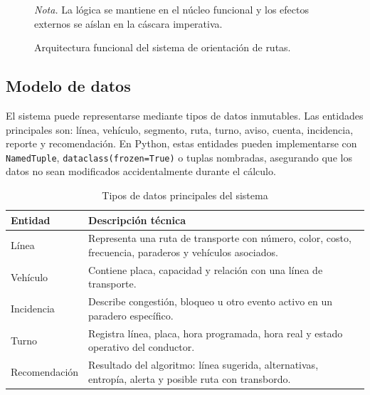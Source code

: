 \documentclass[stu,12pt,floatsintext]{apa7}
\begin{document}
\begin{figure}[H]
\centering
{}
\caption{Arquitectura funcional del sistema de orientación de rutas.}
\par\small\textit{Nota.} La lógica se mantiene en el núcleo funcional y los efectos externos se aíslan en la cáscara imperativa.
\label{fig:arquitectura}
\end{figure}

\subsection{Modelo de datos}
El sistema puede representarse mediante tipos de datos inmutables. Las entidades principales son: línea, vehículo, segmento, ruta, turno, aviso, cuenta, incidencia, reporte y recomendación. En Python, estas entidades pueden implementarse con \texttt{NamedTuple}, \texttt{dataclass(frozen=True)} o tuplas nombradas, asegurando que los datos no sean modificados accidentalmente durante el cálculo.

\begin{table}[H]
\centering
\caption{Tipos de datos principales del sistema}
\begin{tabular}{p{3.2cm}p{9cm}}
\toprule
\textbf{Entidad} & \textbf{Descripción técnica} \\
\midrule
Línea & Representa una ruta de transporte con número, color, costo, frecuencia, paraderos y vehículos asociados. \\
Vehículo & Contiene placa, capacidad y relación con una línea de transporte. \\
Incidencia & Describe congestión, bloqueo u otro evento activo en un paradero específico. \\
Turno & Registra línea, placa, hora programada, hora real y estado operativo del conductor. \\
Recomendación & Resultado del algoritmo: línea sugerida, alternativas, entropía, alerta y posible ruta con transbordo. \\
\bottomrule
\end{tabular}
\label{tab:datos}
\end{table}
\end{document}
